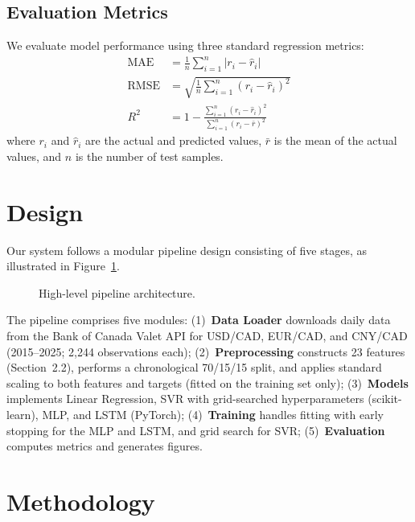 \documentclass{article}
\begin{document}
\subsection{Evaluation Metrics}

We evaluate model performance using three standard regression metrics:
\begin{align}
  \text{MAE} &= \frac{1}{n}\sum_{i=1}^{n} |r_i - \hat{r}_i| \\
  \text{RMSE} &= \sqrt{\frac{1}{n}\sum_{i=1}^{n} (r_i - \hat{r}_i)^2} \\
  R^2 &= 1 - \frac{\sum_{i=1}^{n}(r_i - \hat{r}_i)^2}{\sum_{i=1}^{n}(r_i - \bar{r})^2}
\end{align}
where $r_i$ and $\hat{r}_i$ are the actual and predicted values, $\bar{r}$ is the mean of the actual values, and $n$ is the number of test samples.

	
\section{Design}

Our system follows a modular pipeline design consisting of five stages, as illustrated in Figure~\ref{fig:pipeline}.

\begin{figure}[!t]
  \centering
  \caption{High-level pipeline architecture.}
  \label{fig:pipeline}
\end{figure}

The pipeline comprises five modules: (1)~\textbf{Data Loader} downloads daily data from the Bank of Canada Valet API for USD/CAD, EUR/CAD, and CNY/CAD (2015--2025; 2,244 observations each); (2)~\textbf{Preprocessing} constructs 23 features (Section~2.2), performs a chronological 70/15/15 split, and applies standard scaling to both features and targets (fitted on the training set only); (3)~\textbf{Models} implements Linear Regression, SVR with grid-searched hyperparameters (scikit-learn), MLP, and LSTM (PyTorch); (4)~\textbf{Training} handles fitting with early stopping for the MLP and LSTM, and grid search for SVR; (5)~\textbf{Evaluation} computes metrics and generates figures.


\section{Methodology}
\end{document}
